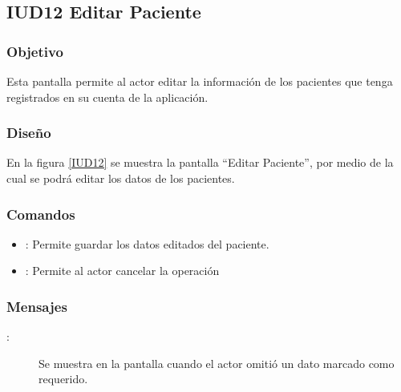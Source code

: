 \subsection{IUD12 Editar Paciente}
 
\subsubsection{Objetivo}

    Esta pantalla permite al actor editar la información de los pacientes que tenga registrados en su cuenta de la aplicación.

\subsubsection{Diseño}

    En la figura \ref{IUD12} se muestra la pantalla ``Editar Paciente'', por medio de la cual se podrá editar los datos de los pacientes. \\


\subsubsection{Comandos}
\begin{itemize}
    \item {}: Permite guardar los datos editados del paciente.
    \item {}: Permite al actor cancelar la operación
    
\end{itemize}

\subsubsection{Mensajes}

\begin{description}
    \item[:] Se muestra en la pantalla  cuando el actor omitió un dato marcado como requerido.
    
\end{description}
